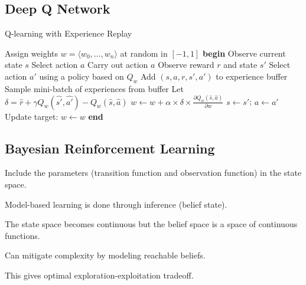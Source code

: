 \documentclass[11pt]{article}
\begin{document}
\subsection{Deep Q Network}
\label{sec:org2bc9089}
\begin{algorithm}
\caption{Q-learning with Experience Replay}
\begin{algorithmic}[1]
\State Assign weights \( w = \langle w_0, \dots, w_n \rangle \) at random in \([-1, 1]\)
\State \textbf{begin}
\State \quad Observe current state \( s \)
\State \quad Select action \( a \)
\Repeat
    \State \quad Carry out action \( a \)
    \State \quad Observe reward \( r \) and state \( s' \)
    \State \quad Select action \( a' \) using a policy based on \( Q_w \)
    \State \quad Add \( (s, a, r, s', a') \) to experience buffer
    \State \quad Sample mini-batch of experiences from buffer
        \State \quad Let \( \delta = \hat{r} + \gamma Q_w(\hat{s'}, \hat{a'}) - Q_w(\hat{s}, \hat{a}) \)
        \State \quad \( w \gets w + \alpha \times \delta \times \frac{\partial Q_w(\hat{s}, \hat{a})}{\partial w} \)
    \EndFor
    \State \quad \( s \gets s' \); \( a \gets a' \)
        \State \quad Update target: \( w \gets w \)
    \EndIf
{}
\State \textbf{end}
\end{algorithmic}
\end{algorithm}
\subsection{Bayesian Reinforcement Learning}
\label{sec:orgc07415e}
Include the parameters (transition function and observation function) in the state space.

Model-based learning is done through inference (belief state).

The state space becomes continuous but the belief space is a space of continuous functions.

Can mitigate complexity by modeling reachable beliefs.

This gives optimal exploration-exploitation tradeoff.
\end{document}
